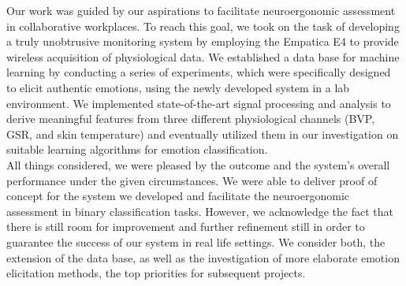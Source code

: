 
Our work was guided by our aspirations to facilitate neuroergonomic assessment in collaborative workplaces. To reach this goal, we took on the task of developing a truly unobtrusive monitoring system by employing the Empatica E4 to provide wireless acquisition of physiological data. We established a data base for machine learning by conducting a series of experiments, which were specifically designed to elicit authentic emotions, using the newly developed system in a lab environment. We implemented state-of-the-art signal processing and analysis to derive meaningful features from three different physiological channels (BVP, GSR, and skin temperature) and eventually utilized them in our investigation on suitable learning algorithms for emotion classification.\\
All things considered, we were pleased by the outcome and the system's overall performance under the given circumstances. We were able to deliver proof of concept for the system we developed and facilitate the neuroergonomic assessment in binary classification tasks. However, we acknowledge the fact that there is still room for improvement and further refinement still in order to guarantee the success of our system in real life settings. We consider both, the extension of the data base, as well as the investigation of more elaborate emotion elicitation methods, the top priorities for subsequent projects.




